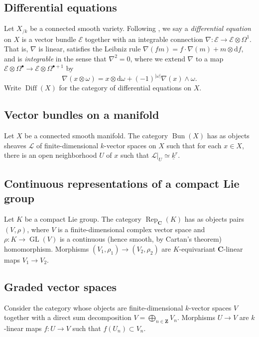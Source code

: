 \documentclass{article}
\DeclareMathOperator{\bun}{Bun}
\DeclareMathOperator{\diff}{Diff}
\DeclareMathOperator{\GL}{GL}
\DeclareMathOperator{\rep}{Rep}
\newcommand{\dC}{\mathbf{C}}
\newcommand{\dZ}{\mathbf{Z}}
\newcommand{\sE}{\mathscr{E}}
\newcommand{\sL}{\mathscr{L}}
\newcommand{\dd}{\mathrm{d}}
\begin{document}
\subsection{Differential equations}\label{sec:diff-eq}

Let $X_{/k}$ be a connected smooth variety. Following 
\cite{katz-1982}, we say a \emph{differential equation} on $X$ is a vector 
bundle $\sE$ together with an integrable connection 
$\nabla:\sE\to\sE\otimes \Omega^1$. That is, $\nabla$ is linear, satisfies the 
Leibniz rule $\nabla(f m) = f\cdot \nabla(m) + m\otimes \dd f$, and is 
\emph{integrable} in the sense that $\nabla^2=0$, where we extend $\nabla$ to 
a map $\sE\otimes\Omega^\bullet \to \sE\otimes\Omega^{\bullet+1}$ by 
\[
  \nabla(x\otimes \omega)=x\otimes \dd \omega + (-1)^{|\omega|} \nabla(x)\wedge \omega .
\] 
Write $\diff(X)$ for the category of differential equations on $X$. 


\subsection{Vector bundles on a manifold}\label{sec:vect-bun}

Let $X$ be a connected smooth manifold. The category $\bun(X)$ has as objects 
sheaves $\sL$ of finite-dimensional $k$-vector spaces on $X$ such that for each 
$x\in X$, there is an open neighborhood $U$ of $x$ such that 
$\sL|_U\simeq \underline k^r$. 


\subsection{Continuous representations of a compact Lie group}\label{sec:rep-cpct}

Let $K$ be a compact Lie group. The category $\rep_\dC(K)$ has as objects 
pairs $(V,\rho)$, where $V$ is a finite-dimensional complex vector space and 
$\rho:K\to \GL(V)$ is a continuous (hence smooth, by Cartan's theorem) 
homomorphism. Morphisms $(V_1,\rho_1)\to (V_2,\rho_2)$ are $K$-equivariant 
$\dC$-linear maps $V_1\to V_2$. 


\subsection{Graded vector spaces}

Consider the category whose objects are finite-dimensional $k$-vector spaces 
$V$ together with a direct sum decomposition $V=\bigoplus_{n\in \dZ} V_n$. 
Morphisms $U\to V$ are $k$-linear maps $f:U\to V$ such that 
$f(U_n)\subset V_n$. 
\end{document}
